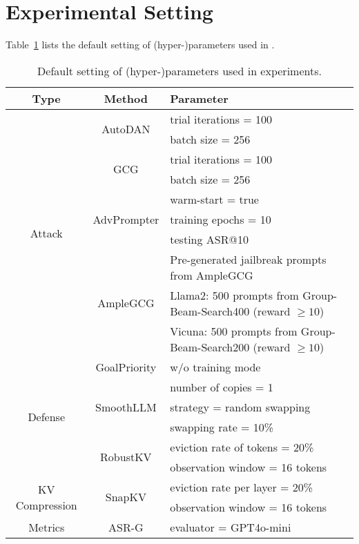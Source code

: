 
\appendix


\section{Experimental Setting}
\label{sec:setting}

Table~\ref{tab:param} lists the default setting of (hyper-)parameters used in .

\begin{table}[!ht]\small
\renewcommand{\arraystretch}{1.1}
\centering
\begin{tabular}{c|c|l}
Type & Method & Parameter  \\
\hline
\multirow{10}{*}{Attack}  & \multirow{2}{*}{AutoDAN} & trial iterations = 100 \\
     &    &  batch size = 256 \\
     \cline{2-3}
 & \multirow{2}{*}{GCG} & trial iterations = 100 \\
& &  batch size = 256 \\
     \cline{2-3}
 & \multirow{3}{*}{AdvPrompter} & warm-start = true \\
 & & training epochs = 10\\
 & & testing ASR@10 \\
     \cline{2-3}
 & \multirow{3}{*}{AmpleGCG}  & Pre-generated jailbreak prompts from AmpleGCG~\citep{amplegcg}\\
 &&   Llama2: 500 prompts from Group-Beam-Search400  (reward $\geq 10$) \\
 && Vicuna: 500 prompts from Group-Beam-Search200 (reward $\geq 10$) \\

\hline
\multirow{6}{*}{Defense} & GoalPriority & w/o training mode \\
\cline{2-3}
 & \multirow{3}{*}{SmoothLLM} & number of copies = 1\\
 & & strategy = random swapping \\
 & & swapping rate = 10\% \\
 \cline{2-3}
 & \multirow{2}{*}{RobustKV} &  eviction rate of tokens = 20\% \\
 & & observation window = 16 tokens \\
\hline
\multirow{2}{*}{KV Compression}  & \multirow{2}{*}{SnapKV} & eviction rate per layer = 20\%\\
& & observation window = 16 tokens \\
\hline
Metrics  & ASR-G & evaluator = GPT4o-mini\\
\end{tabular}
\caption{Default setting of (hyper-)parameters used in experiments. \label{tab:param}}
\end{table}


